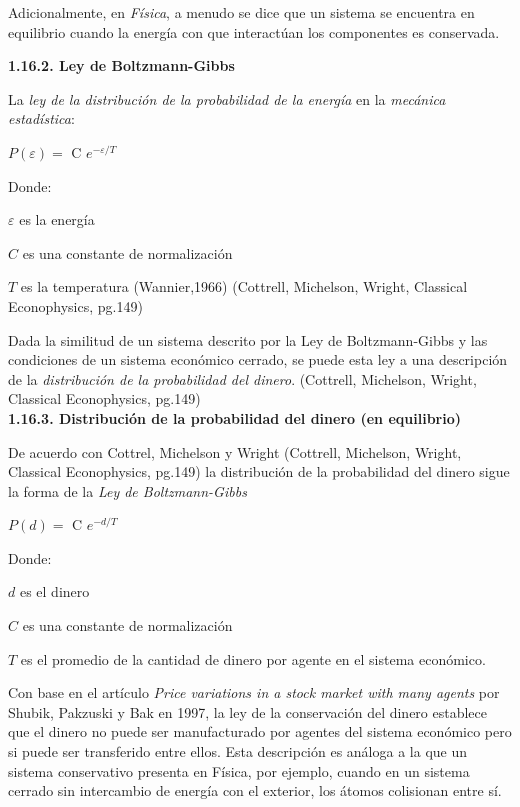 Adicionalmente, en \textit{Física}, a menudo se dice que un sistema se encuentra en equilibrio cuando la energía con que interactúan los componentes es conservada. 
\newline

{
\Large  \textbf{1.16.2. Ley de Boltzmann-Gibbs} 
}

La \textit{ley de la distribución de la probabilidad de la energía} en la \textit{mecánica estadística}:

\begin{center}
$\mathit{P(\varepsilon)} = $ C $e^{-\varepsilon/\mathit{T}}$ 
\end{center}
Donde:

$\varepsilon$ es la energía

$C$ es una constante de normalización

$\mathit{T}$ es la temperatura (Wannier,1966) (Cottrell, Michelson, Wright, Classical Econophysics, pg.149)

Dada la similitud de un sistema descrito por la Ley de Boltzmann-Gibbs y las condiciones de un sistema económico cerrado, se puede esta ley a una descripción de la \textit{distribución de la probabilidad del dinero}.
(Cottrell, Michelson, Wright, Classical Econophysics, pg.149)
\\

{
\Large  \textbf{1.16.3. Distribución de la probabilidad del dinero (en equilibrio)} 
}


De acuerdo con Cottrel, Michelson y Wright (Cottrell, Michelson, Wright, Classical Econophysics, pg.149) la distribución de la probabilidad del dinero sigue la forma de la \textit{Ley de Boltzmann-Gibbs}


\begin{center}
$\mathit{P(d)} = $ C $e^{-d/\mathit{T}}$ 
\end{center}
Donde:

$d$ es el dinero

$C$ es una constante de normalización

$\mathit{T}$ es el promedio de la cantidad de dinero por agente en el sistema económico.

Con base en el artículo \textit{Price variations in a stock market with many agents} por Shubik, Pakzuski y Bak en 1997, la ley de la conservación del dinero establece que el dinero no puede ser manufacturado por agentes del sistema económico pero si puede ser transferido entre ellos. Esta descripción es análoga a la que un sistema conservativo presenta en Física, por ejemplo, cuando en un sistema cerrado sin intercambio de energía con el exterior, los átomos colisionan entre sí. 
\newpage

